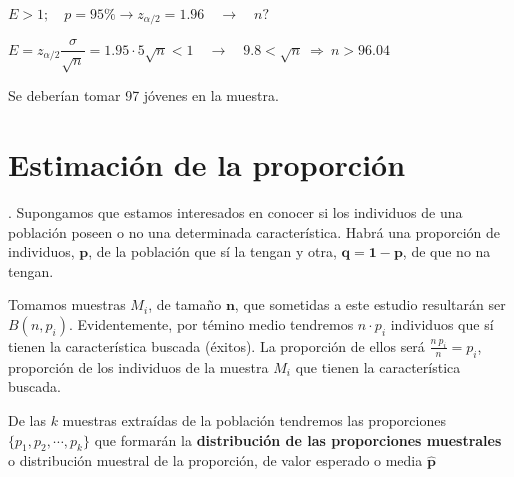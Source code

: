 \vspace{2mm} $E>1; \quad p=95\% \to z_{\alpha/2}=1.96 \quad \to \quad n?$

\vspace{2mm} $E=z_{\alpha/2}\dfrac \sigma {\sqrt{n}} =1.95\cdot 5{\sqrt{n}}<1 \quad \to \quad 9.8<\sqrt{n} \ \Rightarrow \ n>96.04$

\vspace{2mm} Se deberían tomar 97 jóvenes en la muestra.

\section{Estimación de la proporción}

\begin{definition}
.	Supongamos que estamos interesados en conocer si los individuos de una población poseen o no una determinada característica. Habrá una proporción de individuos, $\boldsymbol{p}$, de la población que sí la tengan y otra, $\boldsymbol{q=1-p}$, de que no na tengan.	

\vspace{2mm} Tomamos muestras $M_i$, de tamaño $\boldsymbol{n}$, que sometidas a este estudio resultarán ser $B(n,p_i)$. Evidentemente, por témino medio tendremos $n\cdot p_i$ individuos que sí tienen la característica buscada (éxitos). La proporción de ellos será $\frac{n\ p_i}{n}=p_i$, proporción de los individuos de la muestra $M_i$ que tienen la característica buscada.

\vspace{2mm} De las $k$ muestras extraídas de la población tendremos las proporciones $\{p_1, p_2, \cdots , p_k\}$ que formarán la \textbf{distribución de las proporciones muestrales} o distribución muestral de la proporción, de valor esperado o media $\boldsymbol {\widehat p }$
\end{definition}

